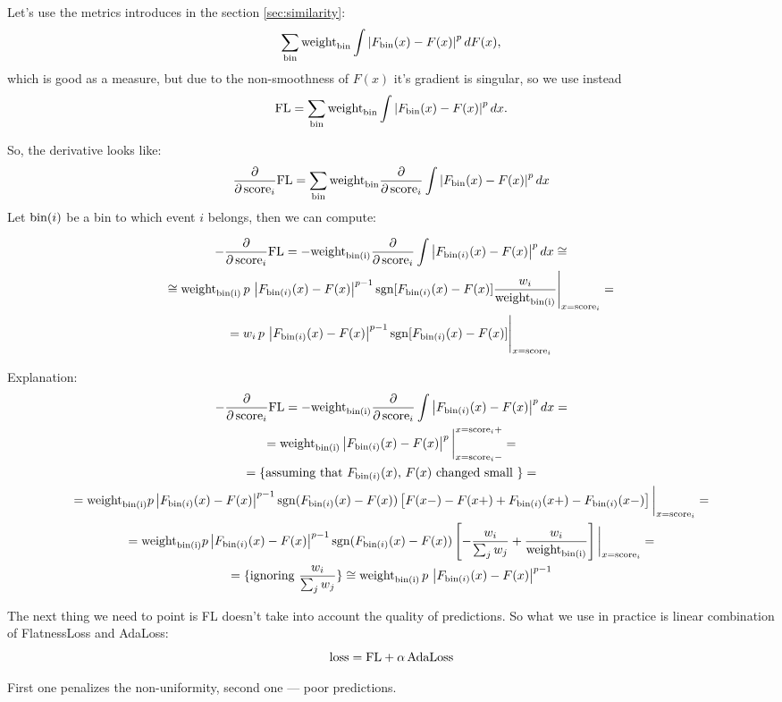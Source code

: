 Let's use the metrics introduces in the section \ref{sec:similarity}:
\[
	\sum_{\text{bin}} \text{weight}_\text{bin} \int \left\vert F_{\text{bin}}(x) - F(x)\right\vert^p dF(x),
\]
which is good as a measure, but due to the non-smoothness of $F(x)$ it's 
gradient is singular, so we use instead
\[
	\text{FL} = \sum_{\text{bin}} \text{weight}_\text{bin} \int \left\vert F_{\text{bin}}(x) - F(x)\right\vert^p dx.
\]

So, the derivative looks like:
\[
	\dfrac{\partial} {\partial \, \text{score}_i} \text{FL}
	= \sum_{\text{bin}} \text{weight}_\text{bin} \frac{\partial }{ \partial \, \text{score}_i} 
			\int \left\vert F_{\text{bin}}(x) - F(x)\right\vert^p dx
\]
Let $\text{bin}(i)$ be a bin to which event $i$ belongs, then we can compute:
\def\binIweight{\text{weight}_\text{\bin(i)}}


\begin{multline*}
	- \dfrac{\partial} {\partial \, \score_i} \FL = 
		- \binIweight
		\frac{\partial }{ \partial \, \score_i} 
			\int \abs{F_{\bin(i)}(x) - F(x)}^p dx \cong \\
	\cong \binIweight \, p \,  \abs{F_{\bin(i)}(x) - F(x)}^{p-1} 
		\sgn[F_{\bin(i)}(x) - F(x)]
		\dfrac{w_i}{\binIweight}
		\Bigg|_{x=\score_i} = \\
	= 
		w_i \, p \,  \abs{F_{\bin(i)}(x) - F(x)}^{p-1}
		\sgn[F_{\bin(i)}(x) - F(x)]
		\Bigg|_{x=\score_i}
\end{multline*}

Explanation:
\begin{multline*}
	- \dfrac{\partial} {\partial \, \score_i} \FL = 
		- \binIweight \frac{\partial }{ \partial \, \score_i} \int \abs{F_{\bin(i)}(x) - F(x)}^p dx = \\
	= \binIweight \abs{F_{\bin(i)}(x) - F(x)}^p \bigg|_{x=\score_i-}^{x=\score_i+} = \\
	= \{ \text{assuming that $F_{\bin(i)}(x)$, $F(x)$ changed small } \} = \\
	= \binIweight p \abs{F_{\bin(i)}(x) - F(x)}^{p-1} \sgn(F_{\bin(i)}(x) - F(x)) \left[F(x-) - F(x+) + F_{\bin(i)}(x+) - F_{\bin(i)}(x-)\right] \bigg|_{x=\score_i}= \\
	= \binIweight p \abs{F_{\bin(i)}(x) - F(x)}^{p-1} \sgn(F_{\bin(i)}(x) - F(x)) \left[- \frac{w_i}{\sum_j w_j} + \frac{w_i}{\binIweight} \right] \bigg|_{x=\score_i}= \\
	= \{ \text{ignoring $\frac{w_i}{\sum_j w_j}$}  \}
	\cong \binIweight \, p \,  \abs{F_{\bin(i)}(x) - F(x)}^{p-1} 
\end{multline*}


The next thing we need to point is FL doesn't take into account the quality of predictions. So what we use in practice is linear combination of FlatnessLoss and AdaLoss:
\[
	\text{loss} = \text{FL} + \alpha \, \text{AdaLoss}
\]

First one penalizes the non-uniformity, second one --- poor predictions.
